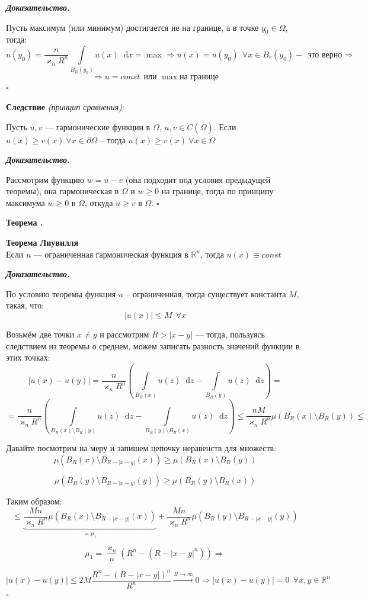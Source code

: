 \documentclass[11pt,a4paper]{report}
\numberwithin{equation}{section}
\numberwithin{figure}{chapter}
\numberwithin{table}{chapter}
\newif\ifinmathphysstatement
\newenvironment{mytheorem}[1][]{%
    \refstepcounter{theoremctr}%
    \inmathphysstatementtrue
    \begin{tcolorbox}[mathphysblock,colframe=theoremcolor,colback=theoremcolor!3,boxrule=0.8pt,#1]
    \textbf{\color{theoremcolor}Теорема \thetheoremctr.}\par\smallskip
}{%
    \end{tcolorbox}
    \inmathphysstatementfalse
}
\newenvironment{myproof}{%
    \begin{tcolorbox}[mathphysblock,colframe=proofcolor!65,colback=proofcolor!2,boxrule=0.5pt]
    \textit{\textbf{Доказательство.}}\par\smallskip
}{%
    \hfill$\square$
    \end{tcolorbox}
}
\newcommand{\R}{\mathbb{R}}
\newcommand{\p}{\partial}
\newcommand{\dd}{\mathop{}\!\mathrm{d}}
\newcommand{\skobka}[1]{\left( #1 \right)}
\begin{document}
\begin{myproof}
Пусть максимум (или минимум) достигается не на границе, а в точке $y_0\in\Omega$, тогда:
\[
u(y_0)=\dfrac{n}{\varkappa_n R^n}\int\limits_{B_R(y_0)}u(x)\dd x = \operatorname{max} \Rightarrow u(x)=u(y_0) \ \ \forall x \in B_r(y_0) - \ \ \text{это верно} \Rightarrow\]\[\Rightarrow u = const \ \ \text{или } \operatorname{max } \text{на границе} 
\]
\end{myproof}

\noindent\textbf{Следствие} \textit{(принцип сравнения)}:

Пусть $u,v$ --- гармонические функции в $\Omega$, $u,v\in C(\overline{\Omega})$. Если $u(x)\geq v(x) \ \forall x\in\p\Omega$ -- тогда $u(x)\geq v(x) \ \forall x\in\overline{\Omega}$
\begin{myproof}
    Рассмотрим функцию $w = u-v$ (она подходит под условия предыдущей теоремы), она гармоническая в $\Omega$ и $w\geq 0$ на границе, тогда по принципу максимума $w\geq 0$ в $\Omega$, откуда $u\geq v$ в $\Omega$.
\end{myproof}

\begin{mytheorem}
    \textbf{Теорема Лиувилля}\\
     Если $u$ --- ограниченная гармоническая функция в $\R^n$, тогда $u(x)\equiv const$
\end{mytheorem}

\begin{myproof}
    По условию теоремы функция $u$ -- ограниченная, тогда существует константа $M$, такая, что:
\[
|u(x)|\leq M \ \ \forall x
\]

Возьмём две точки $x\neq y$ и рассмотрим $R>|x-y|$ --- тогда, пользуясь следствием из теоремы о среднем, можем записать разность значений функции в этих точках:
\[
|u(x) - u(y)| = \dfrac{n}{\varkappa_nR^n}\skobka{\int\limits_{B_R(x)}u(z)\dd z - \int\limits_{B_R(y)}u(z)\dd z}= \]\[= \dfrac{n}{\varkappa_nR^n}\skobka{\int\limits_{B_R(x)\setminus B_R(y)}u(z)\dd z - \int\limits_{B_R(y)\setminus B_R(x)}u(z)\dd z}
\leq\dfrac{nM}{\varkappa_nR^n}\mu(B_R(x)\setminus B_R(y))\boxed{\leq}
\]

Давайте посмотрим на меру и запишем цепочку неравенств для множеств:
\[
\mu(B_R(x)\setminus B_{R-|x-y|}(x))\geq \mu(B_R(x)\setminus B_R(y))
\]

\[
\mu(B_R(y)\setminus B_{R-|x-y|}(y))\geq \mu(B_R(y)\setminus B_R(x))
\]



Таким образом:
\[
\boxed{\leq} \underbrace{\dfrac{Mn}{\varkappa_n R^n}\mu(B_R(x)\setminus B_{R-|x-y|}(x))}_{=\mu_1} + \dfrac{Mn}{\varkappa_n R^n}\mu(B_R(y)\setminus B_{R-|x-y|}(y))
\]

\[\mu_1=\dfrac{\varkappa_n}{n}(R^n-(R-|x-y|^n)) \Rightarrow\]


\[|u(x) - u(y)|\leq 2M\dfrac{R^n - (R - |x-y|)^n}{R^n} \xrightarrow{R\to\infty} 0 \Rightarrow |u(x) - u(y)| = 0 \ \ \forall x,y \in \R^n\]    
\end{myproof}
\end{document}
